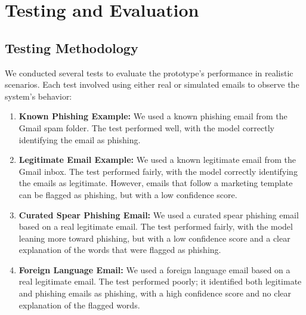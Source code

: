 \documentclass{article}
\begin{document}
\section{Testing and Evaluation}

\subsection{Testing Methodology}
We conducted several tests to evaluate the prototype’s performance in realistic scenarios. Each test involved using either real or simulated emails to observe the system's behavior:
\begin{enumerate}
    \item \textbf{Known Phishing Example:}
    We used a known phishing email from the Gmail spam folder. The test performed well, with the model correctly identifying the email as phishing.
    \item \textbf{Legitimate Email Example:}
    We used a known legitimate email from the Gmail inbox. The test performed fairly, with the model correctly identifying the emails as legitimate. However, emails that follow a marketing template can be flagged as phishing, but with a low confidence score.
    \item \textbf{Curated Spear Phishing Email:}
    We used a curated spear phishing email based on a real legitimate email. The test performed fairly, with the model leaning more toward phishing, but with a low confidence score and a clear explanation of the words that were flagged as phishing.
    \item \textbf{Foreign Language Email:}
    We used a foreign language email based on a real legitimate email. The test performed poorly; it identified both legitimate and phishing emails as phishing, with a high confidence score and no clear explanation of the flagged words.
\end{enumerate}
\end{document}
